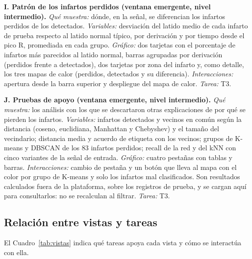 \documentclass[conference]{IEEEtran}
\begin{document}
\smallskip\noindent\textbf{I. Patrón de los infartos perdidos (ventana emergente, nivel intermedio).} \emph{Qué muestra:} dónde, en la señal, se diferencian los infartos perdidos de los detectados. \emph{Variables:} desviación del latido medio de cada infarto de prueba respecto al latido normal típico, por derivación y por tiempo desde el pico R, promediada en cada grupo. \emph{Gráfico:} dos tarjetas con el porcentaje de infartos más parecidos al latido normal, barras agrupadas por derivación (perdidos frente a detectados), dos tarjetas por zona del infarto y, como detalle, los tres mapas de calor (perdidos, detectados y su diferencia). \emph{Interacciones:} apertura desde la barra superior y despliegue del mapa de calor. \emph{Tarea:} T3.

\smallskip\noindent\textbf{J. Pruebas de apoyo (ventana emergente, nivel intermedio).} \emph{Qué muestra:} los análisis con los que se descartaron otras explicaciones de por qué se pierden los infartos. \emph{Variables:} infartos detectados y vecinos en común según la distancia (coseno, euclidiana, Manhattan y Chebyshev) y el tamaño del vecindario; distancia media y acuerdo de etiqueta con los vecinos; grupos de K-means y DBSCAN de los 83 infartos perdidos; recall de la red y del kNN con cinco variantes de la señal de entrada. \emph{Gráfico:} cuatro pestañas con tablas y barras. \emph{Interacciones:} cambio de pestaña y un botón que lleva al mapa con el color por grupo de K-means y solo los infartos mal clasificados. Son resultados calculados fuera de la plataforma, sobre los registros de prueba, y se cargan aquí para consultarlos: no se recalculan al filtrar. \emph{Tarea:} T3.

\subsection{Relación entre vistas y tareas}
El Cuadro~\ref{tab:vistas} indica qué tareas apoya cada vista y cómo se interactúa con ella.
\end{document}
